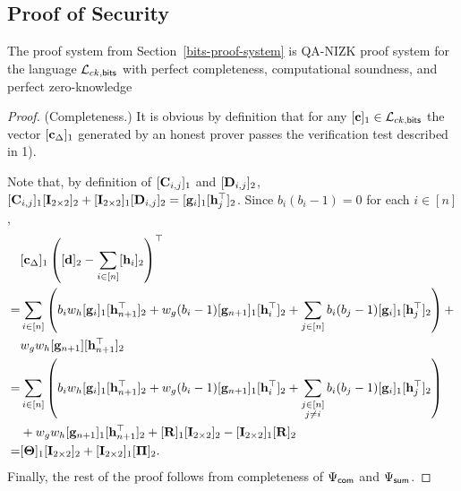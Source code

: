 %


\subsection{Proof of Security}

\begin{theorem}
The proof system from Section~\ref{bits-proof-system} is QA-NIZK proof system for the language $\mathcal{L}_{ck,\mathsf{bits}}$ with perfect completeness, computational soundness, and perfect zero-knowledge
\end{theorem}

\begin{proof}
(Completeness.) It is obvious by definition that for any $[\mathbf{c}]_1\in \mathcal{L}_{ck,\mathsf{bits}}$
the vector $[\mathbf{c}_\Delta]_1$
generated by an honest prover passes the verification test described in 1).

Note that,
by definition of $[\mathbf{{C}}_{i,j}]_1$ and $[\mathbf{{D}}_{i,j}]_2$, 
$[\mathbf{{C}}_{i,j}]_1[\mathbf{{I}}_{2\times2}]_2 + [\mathbf{{I}}_{2\times2}]_1 [\mathbf{{D}}_{i,j}]_2
= [\mathbf{g}_{i}]_1[\mathbf{h}_j^\top]_2$.  Since $b_i(b_i-1) = 0$ for each $i\in[n]$,
\begin{align*}
&[\mathbf{c}_{\Delta}]_1 \left( [\mathbf{d}]_2 - \sum_{i\in[n]} [\mathbf{h}_{i}]_2 \right)^\top \\
  =& 
    \sum_{i \in [n]}\left(
        b_i w_h[\mathbf{g}_{i}]_1[\mathbf{h}_{n+1}^{\top}]_2 +w_g(b_i-1) [\mathbf{g}_{n+1}]_1[\mathbf{h}_i^{\top}]_2 +
        \sum_{j \in [n]} b_i (b_j-1) [\mathbf{g}_{i}]_1[\mathbf{h}_{j}^{\top}]_2
    \right) +\\
&
    w_gw_h [\mathbf{g}_{n+1}][\mathbf{h}_{n+1}^{\top}]_2
\\  = & 
    \sum_{i \in [n]}\left(
        b_i w_h[\mathbf{g}_{i}]_1[\mathbf{h}_{n+1}^\top]_2 +
        w_g(b_i-1) [\mathbf{g}_{n+1}]_1[\mathbf{h}_{i}^\top]_2 +
        \sum_{\substack{j \in [n]\\ j\neq i}} b_i (b_j-1) [\mathbf{g}_{i}]_1[\mathbf{h}_{j}^\top]_2
    \right)
\\  &
    + w_gw_h [\mathbf{g}_{n+1}]_1[\mathbf{h}_{n+1}^\top]_2 +
    [\mathbf{{R}}]_1[\mathbf{{I}}_{2\times2}]_2 - [\mathbf{{I}}_{2\times2}]_1[\mathbf{{R}}]_2
\\  = &
    [\mathbf{{\Theta}}]_1[\mathbf{{I}}_{2\times2}]_2 +
    [\mathbf{{I}}_{2\times2}]_1[\mathbf{{\Pi}}]_2.
\end{align*}
Finally, the rest of the proof follows from completeness of ${\Psi_{\mathsf{com}}}$ and ${\Psi_{\mathsf{sum}}}$. 


\end{proof}
